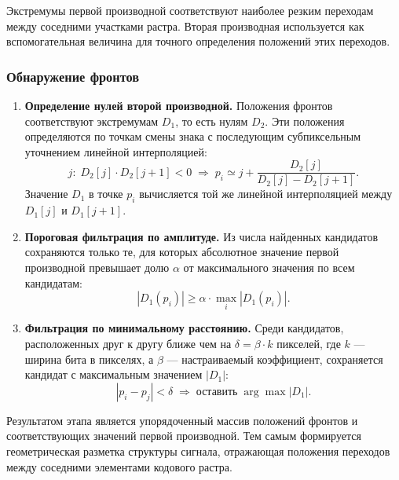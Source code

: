 Экстремумы первой производной соответствуют наиболее резким переходам между соседними участками растра. Вторая производная используется как вспомогательная величина для точного определения положений этих переходов.

\subsubsection{Обнаружение фронтов}

\begin{enumerate}
    \item \textbf{Определение нулей второй производной.} Положения фронтов соответствуют экстремумам $D_1$, то есть нулям $D_2$. Эти положения определяются по точкам смены знака с последующим субпиксельным уточнением линейной интерполяцией:
    \begin{equation}
        j:\;D_2[j]\cdot D_2[j+1] < 0
        \;\Rightarrow\;
        p_i \simeq j + \frac{D_2[j]}{D_2[j]-D_2[j+1]}.
        \label{eq:zerocross}
    \end{equation}
    Значение $D_1$ в точке $p_i$ вычисляется той же линейной интерполяцией между $D_1[j]$ и $D_1[j+1]$.

    \item \textbf{Пороговая фильтрация по амплитуде.} Из числа найденных кандидатов сохраняются только те, для которых абсолютное значение первой производной превышает долю $\alpha$ от максимального значения по всем кандидатам:
    \begin{equation}
        |D_1(p_i)| \geq \alpha \cdot \max_i |D_1(p_i)|.
    \end{equation}

    \item \textbf{Фильтрация по минимальному расстоянию.} Среди кандидатов, расположенных друг к другу ближе чем на $\delta = \beta\cdot k$ пикселей, где $k$ --- ширина бита в пикселях, а $\beta$ --- настраиваемый коэффициент, сохраняется кандидат с максимальным значением $|D_1|$:
    \begin{equation}
        |p_i - p_j| < \delta
        \;\Rightarrow\;
        \text{оставить}\;\arg\max |D_1|.
    \end{equation}
\end{enumerate}

Результатом этапа является упорядоченный массив положений фронтов и соответствующих значений первой производной. Тем самым формируется геометрическая разметка структуры сигнала, отражающая положения переходов между соседними элементами кодового растра.

